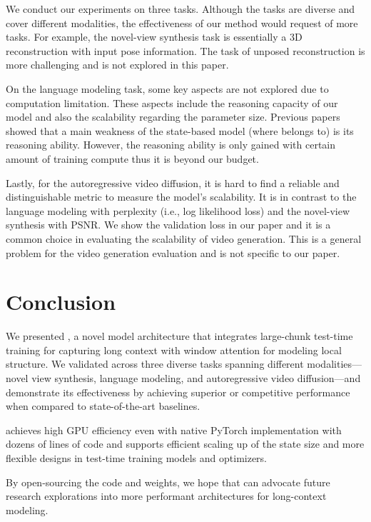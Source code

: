 \documentclass{article}
\begin{document}
We conduct our experiments on three tasks.
Although the tasks are diverse and cover different modalities, the effectiveness of our method would request of more tasks.
For example, the novel-view synthesis task is essentially a 3D reconstruction with input pose information.
The task of unposed reconstruction is more challenging and is not explored in this paper.

On the language modeling task, some key aspects are not explored due to computation limitation.
These aspects include the reasoning capacity of our \methodname{} model and also the scalability regarding the parameter size.
Previous papers showed that a main weakness of the state-based model (where \methodname{} belongs to) is its reasoning ability.
However, the reasoning ability is only gained with certain amount of training compute thus it is beyond our budget.

Lastly, for the autoregressive video diffusion, it is hard to find a reliable and distinguishable metric to measure the model's scalability.
It is in contrast to the language modeling with perplexity (i.e., log likelihood loss) and the novel-view synthesis with PSNR.
We show the validation loss in our paper and it is a common choice in evaluating the scalability of video generation.
This is a general problem for the video generation evaluation and is not specific to our paper.

\section{Conclusion} \label{sec:conclusion}

We presented \methodname{}, a novel model architecture that integrates large-chunk test-time training for capturing long context with window attention for modeling local structure. 
We validated \methodname{} across three diverse tasks spanning different modalities---novel view synthesis, language modeling, and autoregressive video diffusion---and demonstrate its effectiveness  
by achieving superior or competitive performance when compared to state-of-the-art baselines.

\methodname{} achieves high GPU efficiency even with native PyTorch implementation with dozens of lines of code and supports efficient scaling
up of the state size and more flexible designs in test-time training models and optimizers.  

By open-sourcing the code and weights, we hope that \methodname{} can advocate future research explorations 
into more performant architectures for long-context modeling.
\end{document}

